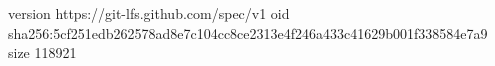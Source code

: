 version https://git-lfs.github.com/spec/v1
oid sha256:5cf251edb262578ad8e7c104cc8ce2313e4f246a433c41629b001f338584e7a9
size 118921
